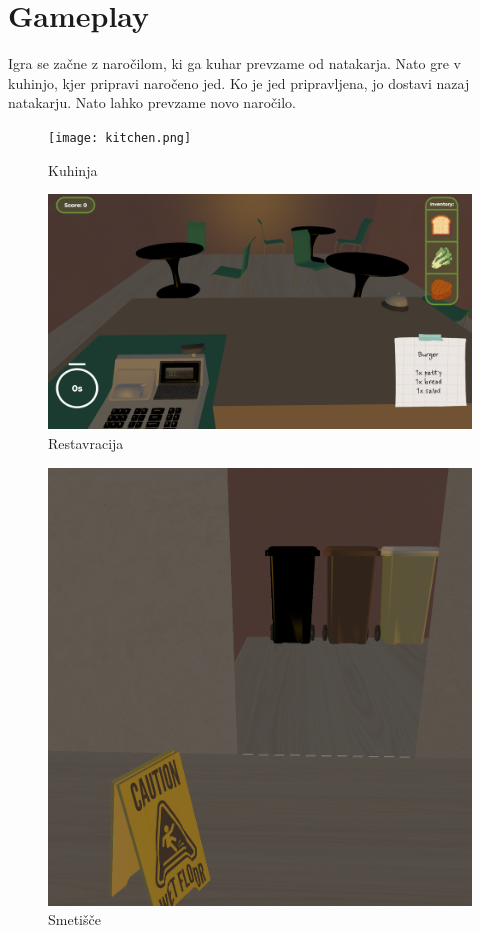 \documentclass[a4paper]{article}
\begin{document}
\section{Gameplay}
Igra se začne z naročilom, ki ga kuhar prevzame od natakarja. Nato gre v kuhinjo, kjer pripravi naročeno jed. 
Ko je jed pripravljena, jo dostavi nazaj natakarju. Nato lahko prevzame novo naročilo. 
\begin{figure}[!htb]
    \begin{center}
        \texttt{[image: kitchen.png]}
        \caption{Kuhinja}

    \end{center}
\end{figure}
\begin{figure}[!htb]
    \begin{center}
        \includegraphics[width=\columnwidth]{restaurant.png}
        \caption{Restavracija}
    \end{center}
\end{figure}
\begin{figure}[!htb]
    \begin{center}
        \includegraphics[width=\columnwidth]{wetFloor.png}
        \caption{Smetišče}
    \end{center}
\end{figure}
\end{document}
